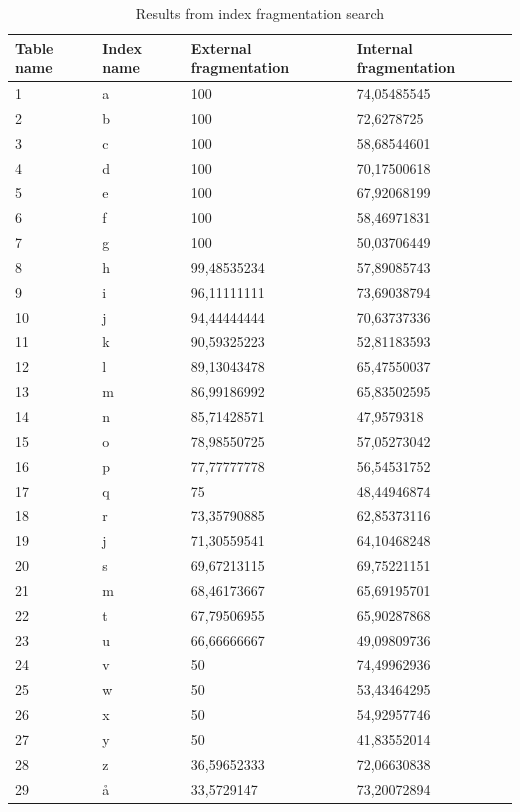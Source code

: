\documentclass{cslthse-msc}
\begin{document}
\begin{table}[H]
\begin{center}
\begin{tabular}{|l|l|l|l|}
\hline
Table name & Index name & External fragmentation & Internal fragmentation \\ \hline 
1  & a & 100         & 74,05485545 \\ \hline
2  & b & 100         & 72,6278725  \\ \hline
3  & c & 100         & 58,68544601 \\ \hline
4  & d & 100         & 70,17500618 \\ \hline
5  & e & 100         & 67,92068199 \\ \hline
6  & f & 100         & 58,46971831 \\ \hline
7  & g & 100         & 50,03706449 \\ \hline
8  & h & 99,48535234 & 57,89085743 \\ \hline
9  & i & 96,11111111 & 73,69038794 \\ \hline
10 & j & 94,44444444 & 70,63737336 \\ \hline
11 & k & 90,59325223 & 52,81183593 \\ \hline
12 & l & 89,13043478 & 65,47550037 \\ \hline
13 & m & 86,99186992 & 65,83502595 \\ \hline
14 & n & 85,71428571 & 47,9579318  \\ \hline
15 & o & 78,98550725 & 57,05273042 \\ \hline
16 & p & 77,77777778 & 56,54531752 \\ \hline
17 & q & 75          & 48,44946874 \\ \hline
18 & r & 73,35790885 & 62,85373116 \\ \hline
19 & j & 71,30559541 & 64,10468248 \\ \hline
20 & s & 69,67213115 & 69,75221151 \\ \hline
21 & m & 68,46173667 & 65,69195701 \\ \hline
22 & t & 67,79506955 & 65,90287868 \\ \hline
23 & u & 66,66666667 & 49,09809736 \\ \hline
24 & v & 50          & 74,49962936 \\ \hline
25 & w & 50          & 53,43464295 \\ \hline
26 & x & 50          & 54,92957746 \\ \hline
27 & y & 50          & 41,83552014 \\ \hline
28 & z & 36,59652333 & 72,06630838 \\ \hline
29 & å & 33,5729147  & 73,20072894 \\ \hline
\end{tabular}
\caption{Results from index fragmentation search}
\end{center}
\end{table}
\end{document}
